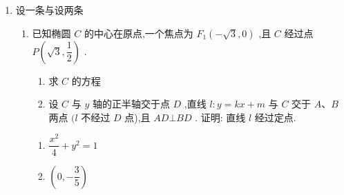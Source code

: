 \begin{enumerate}
    \item 设一条与设两条
    \begin{enumerate}
        \item 已知椭圆 $C$ 的中心在原点,一个焦点为 ${F}_{1}\left( {-\sqrt{3},0}\right)$ ,且 $C$ 经过点 $P\left( {\sqrt{3},\dfrac{1}{2}}\right)$ .
        \begin{enumerate}
            \item 求 $C$ 的方程
            \item 设 $C$ 与 $y$ 轴的正半轴交于点 $D$ ,直线 $l : y = {kx} + m$ 与 $C$ 交于 $A\text{、}B$ 两点 $(l$ 不经过 $D$ 点),且 ${AD} \bot  {BD}$ . 证明: 直线 $l$ 经过定点.
        \end{enumerate}
        \begin{jieda}
            \begin{enumerate}
                \item $\dfrac{x^2}{4}+y^2 = 1$
                \item $\left(0, -\dfrac{3}{5}\right)$
            \end{enumerate}
        \end{jieda}


\end{enumerate}
\end{enumerate}
